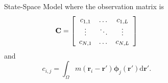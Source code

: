 \documentclass[final]{beamer}
\newlength{\sepwid}
\newlength{\onecolwid}
\begin{document}
\begin{frame}[t]
\begin{columns}[t]
\begin{column}{\onecolwid}
\begin{block}{State-Space Model}
{	where the observation matrix is 
	\begin{equation}
			\mathbf{C} = \left[
			\begin{array}{{ccc}} 
				c_{1,1} & \dots & c_{1,L} \\
				\vdots & \ddots & \vdots \\
				c_{N,1} & \dots & c_{N,L} 
			\end{array}
			\right] 
		\end{equation}
		and 
		\begin{equation}
			c_{i,j} = \int_{\Omega}m(\mathbf{r}_i - \mathbf{r}')\boldsymbol{\phi}_j(\mathbf{r}')\textrm{d}\mathbf{r}'. 
		\end{equation}
	}
\end{block}

    \end{column}



  \begin{column}{\sepwid}\end{column}			%
	\begin{column}{\onecolwid}


\end{column}
\end{columns}
\end{frame}
\end{document}
